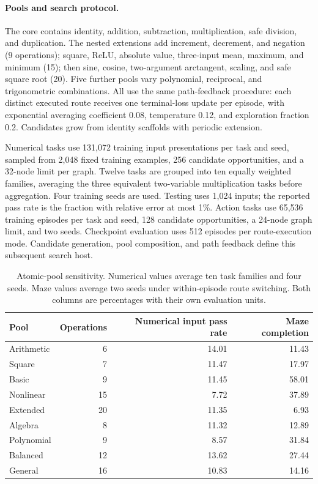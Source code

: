 \paragraph{Pools and search protocol.}
The core contains identity, addition, subtraction, multiplication, safe
division, and duplication. The nested extensions add increment, decrement,
and negation (9 operations); square, ReLU, absolute value, three-input mean,
maximum, and minimum (15); then sine, cosine, two-argument arctangent, scaling,
and safe square root (20). Five further pools vary polynomial, reciprocal,
and trigonometric combinations. All use the same path-feedback procedure:
each distinct executed route receives one terminal-loss update per episode,
with exponential averaging coefficient 0.08, temperature 0.12, and exploration
fraction 0.2. Candidates grow from identity scaffolds with periodic extension.

Numerical tasks use 131,072 training input presentations per task and seed,
sampled from 2,048 fixed training examples, 256 candidate opportunities, and a
32-node limit per graph. Twelve tasks are grouped into ten equally weighted
families, averaging the three equivalent two-variable multiplication tasks
before aggregation. Four training seeds are used. Testing uses 1,024 inputs;
the reported pass rate is the fraction with relative error at most 1\%.
Action tasks use 65,536 training episodes per task and seed, 128 candidate
opportunities, a 24-node graph limit, and two seeds. Checkpoint evaluation uses
512 episodes per route-execution mode. Candidate generation, pool composition,
and path feedback define this subsequent search host.

\begin{table}[tb]
\centering
\small
\caption{Atomic-pool sensitivity. Numerical values average ten task families
and four seeds. Maze values average two seeds under within-episode route
switching. Both columns are percentages with their own evaluation units.}
\label{tab:revision_pool_full}
\begin{tabular}{lrrr}
\toprule
Pool & Operations & Numerical input pass rate & Maze completion \\
\midrule
Arithmetic & 6 & 14.01 & 11.43 \\
Square & 7 & 11.47 & 17.97 \\
Basic & 9 & 11.45 & 58.01 \\
Nonlinear & 15 & 7.72 & 37.89 \\
Extended & 20 & 11.35 & 6.93 \\
Algebra & 8 & 11.32 & 12.89 \\
Polynomial & 9 & 8.57 & 31.84 \\
Balanced & 12 & 13.62 & 27.44 \\
General & 16 & 10.83 & 14.16 \\
\bottomrule
\end{tabular}
\end{table}

